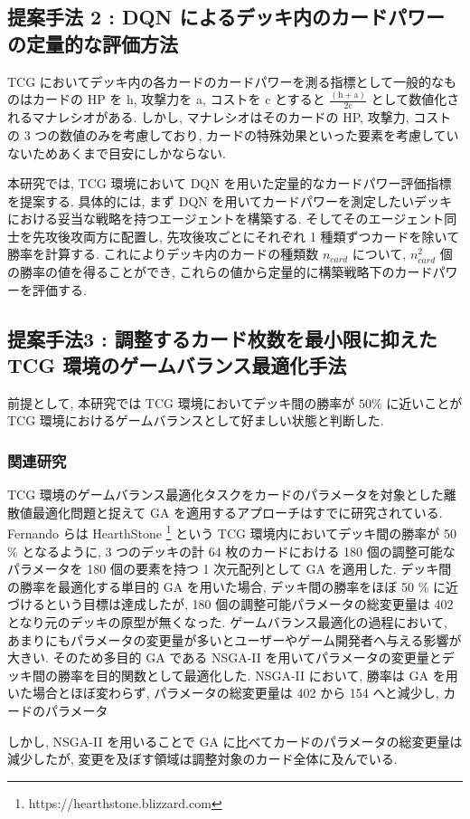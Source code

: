 \documentclass[12pt]{jarticle}
\begin{document}
\subsection{提案手法 2 : DQN によるデッキ内のカードパワーの定量的な評価方法}
TCG においてデッキ内の各カードのカードパワーを測る指標として一般的なものはカードの HP を h, 攻撃力を a, コストを c とすると $\frac{(\mathrm{h} + \mathrm{a})}{2\mathrm{c}} $ として数値化されるマナレシオがある. 
しかし, マナレシオはそのカードの HP, 攻撃力, コストの 3 つの数値のみを考慮しており, カードの特殊効果といった要素を考慮していないためあくまで目安にしかならない. \par
本研究では, TCG 環境において DQN を用いた定量的なカードパワー評価指標を提案する.
具体的には, まず DQN を用いてカードパワーを測定したいデッキにおける妥当な戦略を持つエージェントを構築する. 
そしてそのエージェント同士を先攻後攻両方に配置し, 先攻後攻ごとにそれぞれ 1 種類ずつカードを除いて勝率を計算する. これによりデッキ内のカードの種類数 $n_{card}$ について, $n_{card}^2$ 個の勝率の値を得ることができ, これらの値から定量的に構築戦略下のカードパワーを評価する. 


\subsection{提案手法3 : 調整するカード枚数を最小限に抑えた TCG 環境のゲームバランス最適化手法}
前提として, 本研究では TCG 環境においてデッキ間の勝率が $50\%$ に近いことが TCG 環境におけるゲームバランスとして好ましい状態と判断した.

\subsubsection{関連研究}
\label{hearthstone}
TCG 環境のゲームバランス最適化タスクをカードのパラメータを対象とした離散値最適化問題と捉えて GA を適用するアプローチはすでに研究されている.
Fernando らは HearthStone \footnote[2]{https://hearthstone.blizzard.com} という TCG 環境内においてデッキ間の勝率が 50 \% となるように, 3 つのデッキの計 64 枚のカードにおける 180 個の調整可能なパラメータを 180 個の要素を持つ 1 次元配列として GA を適用した\cite{EvolvingHearthStone}.
デッキ間の勝率を最適化する単目的 GA を用いた場合, デッキ間の勝率をほぼ 50 \% に近づけるという目標は達成したが, 180 個の調整可能パラメータの総変更量は 402 となり元のデッキの原型が無くなった. 
ゲームバランス最適化の過程において, あまりにもパラメータの変更量が多いとユーザーやゲーム開発者へ与える影響が大きい. そのため多目的 GA である NSGA-II を用いてパラメータの変更量とデッキ間の勝率を目的関数として最適化した.
NSGA-II において, 勝率は GA を用いた場合とほぼ変わらず, パラメータの総変更量は 402 から 154 へと減少し, カードのパラメータ
\par
しかし, NSGA-II を用いることで GA に比べてカードのパラメータの総変更量は減少したが, 変更を及ぼす領域は調整対象のカード全体に及んでいる.  
\end{document}
